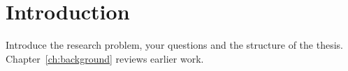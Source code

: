 \chapter{Introduction}
\label{ch:intro}
Introduce the research problem, your questions and the structure of the thesis.
Chapter~\ref{ch:background} reviews earlier work.
